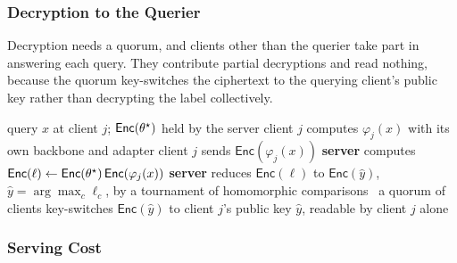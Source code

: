 \subsubsection{Decryption to the Querier}
Decryption needs a quorum, and clients other than the querier take part in
answering each query. They contribute partial decryptions and read nothing,
because the quorum key-switches the ciphertext to the querying client's public
key rather than decrypting the label collectively.

\begin{algorithm}[t]
\caption{Answering one query. The shared head remains a ciphertext throughout.}
\label{alg:serve}
\small
\begin{algorithmic}[1]
\Require query $x$ at client $j$; $\mathsf{Enc}(\theta^{\star})$ held by the server
\State client $j$ computes $\varphi_j(x)$ with its own backbone and adapter
\State client $j$ sends $\mathsf{Enc}(\varphi_j(x))$
\State \textbf{server} computes
       $\mathsf{Enc}(\ell) \gets \mathsf{Enc}(\theta^{\star})\,\mathsf{Enc}(\varphi_j(x))$
\State \textbf{server} reduces $\mathsf{Enc}(\ell)$ to
       $\mathsf{Enc}(\hat{y})$, $\hat y=\arg\max_c \ell_c$, by a tournament of
       homomorphic comparisons~\cite{cheon2020comparison}
\State a quorum of clients key-switches $\mathsf{Enc}(\hat y)$ to client $j$'s
       public key
\State \Return $\hat y$, readable by client $j$ alone
\end{algorithmic}
\end{algorithm}

\subsubsection{Serving Cost}

